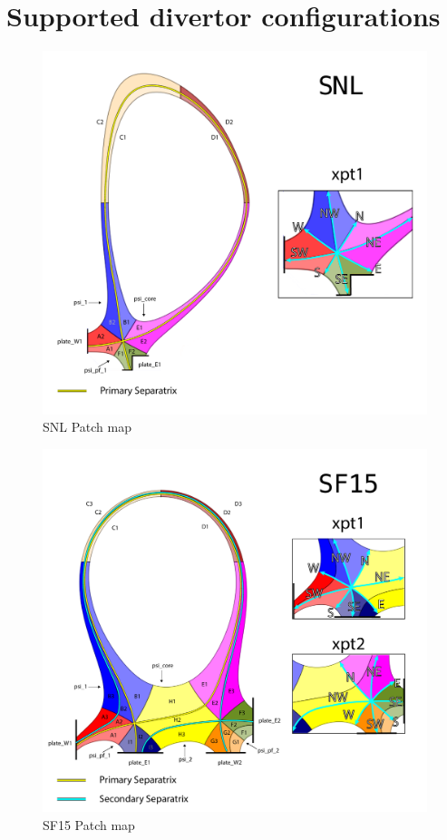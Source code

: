 \section{Supported divertor configurations}
\begin{figure}[H]
    \centering
        \includegraphics[width=\textwidth]{figures/configurations/SNL_collection.pdf}
        \caption{SNL Patch map}
        \label{fig:snl_patch_map}
\end{figure}
\begin{figure}[H]
    \centering
        \includegraphics[width=\textwidth]{figures/configurations/SF15_collection.pdf}
        \caption{SF15 Patch map}
        \label{fig:sf15_patch_map}
\end{figure}
